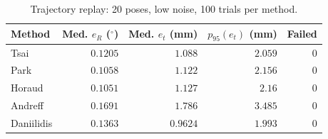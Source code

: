 \begin{table}[!htbp]\centering\footnotesize\setlength{\tabcolsep}{4pt}
\caption{Trajectory replay: 20 poses, low noise, 100 trials per method.}\label{tab:replay-low}
\begin{tabular}{lrrrr}
\toprule
Method & Med. $e_R$ ($^\circ$) & Med. $e_t$ (mm) & $p_{95}(e_t)$ (mm) & Failed \\
\midrule
Tsai & $0.1205$ & $1.088$ & $2.059$ & 0 \\
Park & $0.1058$ & $1.122$ & $2.156$ & 0 \\
Horaud & $0.1051$ & $1.127$ & $2.16$ & 0 \\
Andreff & $0.1691$ & $1.786$ & $3.485$ & 0 \\
Daniilidis & $0.1363$ & $0.9624$ & $1.993$ & 0 \\
\bottomrule
\end{tabular}
\end{table}
